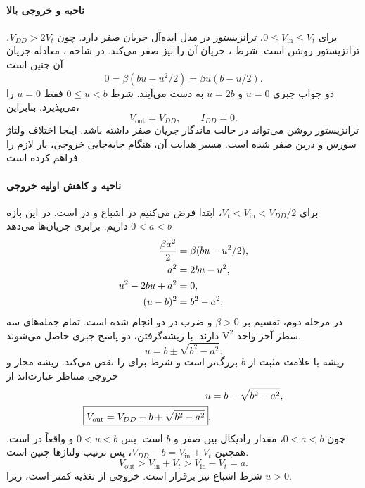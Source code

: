 \paragraph*{ناحیه  و خروجی بالا}
برای \(0\le V_{\mathrm{in}}\le V_t\)، ترانزیستور 
در مدل ایده‌آل جریان صفر دارد. چون \(V_{DD}>2V_t\)، ترانزیستور
 روشن است. شرط ، جریان آن را نیز صفر می‌کند.
در شاخه ، معادله جریان آن چنین است
\[
 0=\beta(bu-u^2/2)=\beta u(b-u/2).
\]
دو جواب جبری \(u=0\) و \(u=2b\) به دست می‌آیند. شرط
\(0\le u<b\) فقط \(u=0\) را می‌پذیرد. بنابراین،
\begin{equation}
 \boxed{V_{\mathrm{out}}=V_{DD},\qquad I_{DD}=0}.
 \label{eq:inverter-region-a}
\end{equation}
ترانزیستور روشن می‌تواند در حالت ماندگار جریان صفر داشته باشد.
اینجا اختلاف ولتاژ سورس و درین  صفر شده است. مسیر
هدایت آن، هنگام جابه‌جایی خروجی، بار لازم را فراهم کرده است.

\paragraph*{ناحیه  و کاهش اولیه خروجی}
برای \(V_t<V_{\mathrm{in}}<V_{DD}/2\)، ابتدا فرض می‌کنیم
 در اشباع و  در  است.
در این بازه \(0<a<b\) داریم. برابری جریان‌ها می‌دهد
\begin{align}
 \frac{\beta a^2}{2}&=\beta(bu-u^2/2),\notag\\
 a^2&=2bu-u^2,\notag\\
 u^2-2bu+a^2&=0,\notag\\
 (u-b)^2&=b^2-a^2.
 \label{eq:inverter-b-quadratic}
\end{align}
در مرحله دوم، تقسیم بر \(\beta>0\) و ضرب در دو انجام شده است.
تمام جمله‌های سه سطر آخر واحد \(\unit{\volt\squared}\) دارند.
با ریشه‌گرفتن، دو پاسخ جبری حاصل می‌شوند.
\[
 u=b\pm\sqrt{b^2-a^2}.
\]
ریشه با علامت مثبت از \(b\) بزرگ‌تر است و شرط 
برای  را نقض می‌کند. ریشه مجاز و خروجی متناظر عبارت‌اند از
\begin{align}
 u&=b-\sqrt{b^2-a^2},\notag\\
 \boxed{V_{\mathrm{out}}=V_{DD}-b+\sqrt{b^2-a^2}}.
 \label{eq:inverter-b-root}
\end{align}
چون \(0<a<b\)، مقدار رادیکال بین صفر و \(b\) است.
پس \(0<u<b\) و  واقعاً در  است.
همچنین \(V_{DD}-b=V_{\mathrm{in}}+V_t\)، پس
ترتیب ولتاژها چنین است.
\[
 V_{\mathrm{out}}>V_{\mathrm{in}}+V_t>V_{\mathrm{in}}-V_t=a.
\]
شرط اشباع  نیز برقرار است.
خروجی از تغذیه کمتر است، زیرا \(u>0\).

